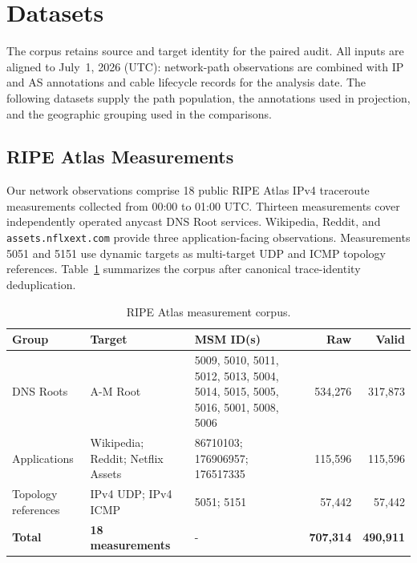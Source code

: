 \section{Datasets}
\label{sec:datasets}

The corpus retains source and target identity for the paired audit.
All inputs are aligned to July~1, 2026 (UTC): network-path observations
are combined with IP and AS annotations and cable lifecycle records for
the analysis date. The following datasets supply the path population,
the annotations used in projection, and the geographic grouping used
in the comparisons.

\subsection{RIPE Atlas Measurements}
\label{subsec:atlas_corpus}

Our network observations comprise 18 public RIPE Atlas IPv4 traceroute
measurements collected from 00:00 to 01:00 UTC. Thirteen measurements cover
independently operated anycast DNS Root services. Wikipedia, Reddit, and
\texttt{assets.nflxext.com} provide three application-facing observations.
Measurements 5051 and 5151 use dynamic targets as multi-target UDP and ICMP
topology references. Table~\ref{tab:atlas_measurements} summarizes the corpus
after canonical trace-identity deduplication.

\begin{table}[ht]
  \centering
  \caption{RIPE Atlas measurement corpus.}
  \label{tab:atlas_measurements}
  \footnotesize
  \setlength{\tabcolsep}{4.2pt}
  \begin{tabular}{p{}p{}p{}rr}
    \toprule
    Group & Target & MSM ID(s) & Raw & Valid \\
    \midrule
    DNS Roots & A-M Root
      & 5009, 5010, 5011, 5012, 5013, 5004, 5014, 5015, 5005, 5016,
        5001, 5008, 5006
      & 534,276 & 317,873 \\
    Applications & Wikipedia; Reddit; Netflix Assets
      & 86710103; 176906957; 176517335
      & 115,596 & 115,596 \\
    Topology references & IPv4 UDP; IPv4 ICMP
      & 5051; 5151
      & 57,442 & 57,442 \\
    \midrule
    \textbf{Total} & \textbf{18 measurements} & -
      & \textbf{707,314} & \textbf{490,911} \\
    \bottomrule
  \end{tabular}
\end{table}

